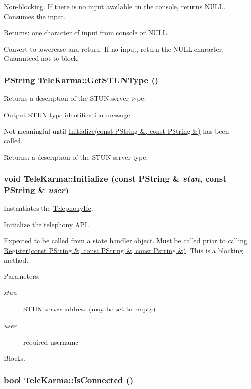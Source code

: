Non-blocking. If there is no input available on the console, returns NULL. Consumes the input. \begin{Desc}
\item[Returns:]one character of input from console or NULL.\end{Desc}
Convert to lowercase and return. If no input, return the NULL character. Guaranteed not to block. \hypertarget{classTeleKarma_394f0108ecd1628e510c79a5f84a8d7d}{
\subsubsection[{GetSTUNType}]{\setlength{\rightskip}{0pt plus 5cm}PString TeleKarma::GetSTUNType ()}}
\label{classTeleKarma_394f0108ecd1628e510c79a5f84a8d7d}


Returns a description of the STUN server type. 

Output STUN type identification message.

Not meaningful until \hyperlink{classTeleKarma_94f24d2895a64c49d1d5daf9a5a40c7e}{Initialize(const PString \&, const PString \&)} has been called. \begin{Desc}
\item[Returns:]a description of the STUN server type.\end{Desc}
\hypertarget{classTeleKarma_94f24d2895a64c49d1d5daf9a5a40c7e}{
\subsubsection[{Initialize}]{\setlength{\rightskip}{0pt plus 5cm}void TeleKarma::Initialize (const PString \& {\em stun}, \/  const PString \& {\em user})}}
\label{classTeleKarma_94f24d2895a64c49d1d5daf9a5a40c7e}


Instantiates the \hyperlink{classTelephonyIfc}{TelephonyIfc}. 

Initialize the telephony API.

Expected to be called from a state handler object. Must be called prior to calling \hyperlink{}{Register(const PString \&, const PString \&, const Pstring \&)}. This is a blocking method. \begin{Desc}
\item[Parameters:]
\begin{description}
\item[{\em stun}]STUN server address (may be set to empty) \item[{\em user}]required username\end{description}
\end{Desc}
Blocks. \hypertarget{classTeleKarma_d971a263dc085039322afa915a6ff350}{
\subsubsection[{IsConnected}]{\setlength{\rightskip}{0pt plus 5cm}bool TeleKarma::IsConnected ()}}
\label{classTeleKarma_d971a263dc085039322afa915a6ff350}


